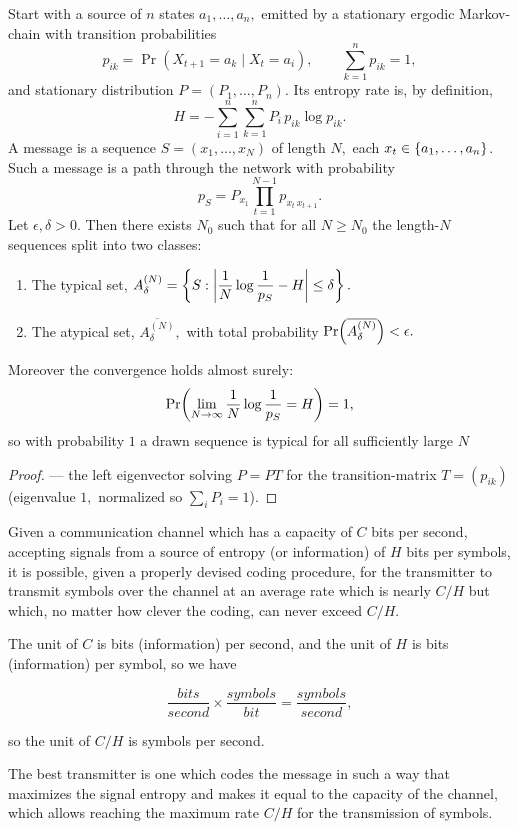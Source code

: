 \documentclass{article}
\begin{document}
\begin{theorem}
Start with a source of $n$ states $a_1, \dots, a_n,$ emitted by a \@{stationary} \@{ergodic} \@{Markov-chain} with transition probabilities
    \[ p_{ik} = \Pr(X_{t+1} = a_k \mid X_t = a_i), \qquad \textstyle\sum_{k=1}^n p_{ik} = 1, \]
and \@{stationary distribution} $P = (P_1, \dots, P_n)$. Its \@{entropy rate} is, by definition,
    \[ H = -\sum_{i=1}^n \sum_{k=1}^n P_i\, p_{ik} \log{p_{ik}}. \]
A message is a \@{sequence} $S = (x_1, \dots, x_N)$ of length $N,$ each $x_t \in \left\{ a_1, \dots, a_n \right\}$. Such a message is a path through the network with probability
    \[ p_S = P_{x_1} \prod_{t=1}^{N-1} p_{x_t\, x_{t+1}}. \]
Let $\epsilon, \delta > 0.$ Then there exists $N_0$ such that for all $N \geq N_0$ the length-$N$ sequences split into two classes:
    \begin{enumerate}
        \item The typical set,
              $A_\delta^{(N)} = \left\{ S : \left| \dfrac{1}{N} \log{\dfrac{1}{p_S}} - H \right| \leq \delta \right\}.$
        \item The atypical set, $\overline{A_\delta^{(N)}},$ with total probability
              $\Pr\!\left(\overline{A_\delta^{(N)}}\right) < \epsilon.$
    \end{enumerate}
Moreover the convergence holds \@{almost surely}:
    \[ \Pr\!\left(\lim_{N \to \infty} \frac{1}{N} \log{\frac{1}{p_S}} = H\right) = 1, \]
so with probability $1$ a drawn sequence is typical for all sufficiently large $N$
\begin{proof}
 --- the left eigenvector
    solving $P = PT$ for the \@{transition-matrix} $T = (p_{ik})$ (eigenvalue $1,$
    normalized so $\sum_i P_i = 1$).
\end{proof}
\end{theorem}


\begin{theorem}
Given a communication channel which has a \@{capacity} of $C$ bits per second, accepting signals from a source of \@{entropy} (or information) of $H$ bits per symbols, it is possible, given a properly devised coding procedure, for the transmitter to transmit symbols over the channel at an average rate which is nearly $C/H$ but which, no matter how clever the coding, can never exceed $C/H.$
\end{theorem}

\detach

\begin{note}
The unit of $C$ is bits (information) per second, and the unit of $H$ is bits (information) per symbol, so we have

\[ \frac{bits}{second} \times \frac{symbols}{bit} = \frac{symbols}{second}, \]

so the unit of $C/H$ is symbols per second.

The best transmitter is one which codes the message in such a way that maximizes the signal \@{entropy} and makes it equal to the \@{capacity} of the channel, which allows reaching the maximum rate $C/H$ for the transmission of symbols.
\end{note}
\end{document}
